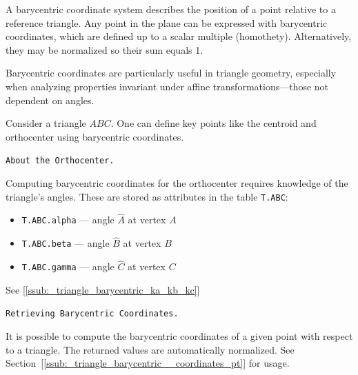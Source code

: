 A barycentric coordinate system describes the position of a point relative to a reference triangle. Any point in the plane can be expressed with barycentric coordinates, which are defined up to a scalar multiple (homothety). Alternatively, they may be normalized so their sum equals 1.

Barycentric coordinates are particularly useful in triangle geometry, especially when analyzing properties invariant under affine transformations—those not dependent on angles.

Consider a triangle $ABC$. One can define key points like the centroid and orthocenter using barycentric coordinates.

\medskip
\texttt{About the Orthocenter.}

Computing barycentric coordinates for the orthocenter requires knowledge of the triangle's angles. These are stored as attributes in the table \texttt{T.ABC}:
\begin{itemize}
  \item \texttt{T.ABC.alpha} — angle $\widehat{A}$ at vertex $A$
  \item \texttt{T.ABC.beta}  — angle $\widehat{B}$ at vertex $B$
  \item \texttt{T.ABC.gamma} — angle $\widehat{C}$ at vertex $C$
\end{itemize}

See  [\ref{ssub:_triangle_barycentric_ka_kb_kc}]

\medskip
\texttt{Retrieving Barycentric Coordinates.}

It is possible to compute the barycentric coordinates of a given point with respect to a triangle. The returned values are automatically normalized. See Section~[\ref{ssub:_triangle_barycentric__coordinates_pt}] for usage.


\begin{minipage}{.5\textwidth}
\end{minipage}
\begin{minipage}{.5\textwidth}
\begin{tkzexample}
\end{tkzexample}
\end{minipage}

